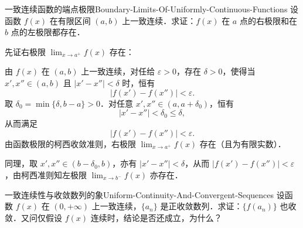 \begin{problem}{一致连续函数的端点极限}{Boundary-Limits-Of-Uniformly-Continuous-Functions}
    设函数 $f(x)$ 在有限区间 $(a, b)$ 上一致连续．求证：$f(x)$ 在 $a$ 点的右极限和在 $b$ 点的左极限都存在．
\end{problem}

\begin{myproof}
    先证右极限 $\lim_{x\to a^+} f(x)$ 存在：

    由 $f(x)$ 在 $(a, b)$ 上一致连续，对任给 $\varepsilon > 0$，存在 $\delta > 0$，使得当 $x', x'' \in (a, b)$ 且 $|x' - x''| < \delta$ 时，恒有
    \begin{equation}
        |f(x') - f(x'')| < \varepsilon.
    \end{equation}
    取 $\delta_0 = \min\{\delta, b - a\} > 0$．对任意 $x', x'' \in (a, a + \delta_0)$，恒有
    \begin{equation}
        |x' - x''| < \delta_0 \leqslant \delta,
    \end{equation}
    从而满足
    \begin{equation}
        |f(x') - f(x'')| < \varepsilon.
    \end{equation}
    由函数极限的柯西收敛准则，右极限 $\lim_{x\to a^+} f(x)$ 存在（且为有限实数）．

    同理，取 $x', x'' \in (b - \delta_0, b)$，亦有 $|x' - x''| < \delta$，从而 $|f(x') - f(x'')| < \varepsilon$，由柯西准则知左极限 $\lim_{x\to b^-} f(x)$ 亦存在．
\end{myproof}

\begin{problem}{一致连续性与收敛数列的象}{Uniform-Continuity-And-Convergent-Sequences}
    设函数 $f(x)$ 在 $(0, +\infty)$ 上一致连续，$\{a_n\}$ 是正收敛数列．求证：$\{f(a_n)\}$ 也收敛．又问仅假设 $f(x)$ 连续时，结论是否还成立，为什么？
\end{problem}


